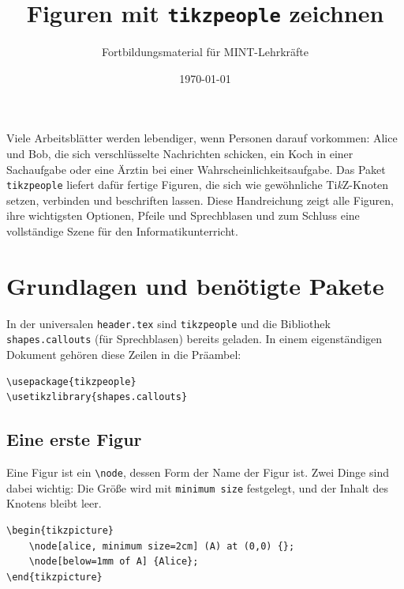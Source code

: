 



\title{Figuren mit \texttt{tikzpeople} zeichnen}
\author{Fortbildungsmaterial für MINT-Lehrkräfte}
\date{\today}
\pagestyle{plain}
\setlength{\parskip}{1.5em} %
\setlength{\emergencystretch}{2em} %




\maketitle

Viele Arbeitsblätter werden lebendiger, wenn Personen darauf vorkommen: Alice und Bob, die sich verschlüsselte Nachrichten schicken, ein Koch in einer Sachaufgabe oder eine Ärztin bei einer Wahrscheinlichkeitsaufgabe. Das Paket \texttt{tikzpeople} liefert dafür fertige Figuren, die sich wie gewöhnliche Ti\textit{k}Z-Knoten setzen, verbinden und beschriften lassen. Diese Handreichung zeigt alle Figuren, ihre wichtigsten Optionen, Pfeile und Sprechblasen und zum Schluss eine vollständige Szene für den Informatikunterricht.



\section{Grundlagen und benötigte Pakete}

In der universalen \texttt{header.tex} sind \texttt{tikzpeople} und die Bibliothek \texttt{shapes.callouts} (für Sprechblasen) bereits geladen. In einem eigenständigen Dokument gehören diese Zeilen in die Präambel:

\begin{lstlisting}[style=latex]
\usepackage{tikzpeople}
\usetikzlibrary{shapes.callouts}
\end{lstlisting}


\subsection{Eine erste Figur}

Eine Figur ist ein \texttt{\textbackslash node}, dessen Form der Name der Figur ist. Zwei Dinge sind dabei wichtig: Die Größe wird mit \texttt{minimum size} festgelegt, und der Inhalt des Knotens bleibt leer.

\begin{lstlisting}[style=latex]
\begin{tikzpicture}
	\node[alice, minimum size=2cm] (A) at (0,0) {};
	\node[below=1mm of A] {Alice};
\end{tikzpicture}
\end{lstlisting}

